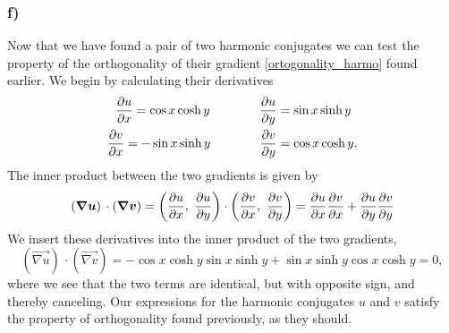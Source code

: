 \documentclass[12pt,twoside]{article}
\begin{document}
\subsubsection*{f)}
Now that we have found a pair of two harmonic conjugates we can test the property of the orthogonality of their gradient \eqref{ortogonality_harmo} found earlier. We begin by calculating their derivatives
\begin{align}
  \begin{split}
  \pdv{u}{x} = \cos{x}\cosh{y}\qquad \qquad\pdv{u}{y} &= \sin{x}\sinh{y} \\
  \pdv{v}{x} = -\sin{x}\sinh{y}\qquad \qquad\pdv{v}{y} &= \cos{x}\cosh{y}. \label{derivatives_2}
\end{split}
\end{align}
The inner product between the two gradients is given by
\begin{equation}
  \left( {\boldsymbol{{ \nabla u}}} \right) \,\cdot   \left( {\boldsymbol{{ \nabla v}}} \right) = \left( \pdv{u}{x}, \,\, \pdv{u}{y} \right)\cdot \left( \pdv{v}{x}, \,\, \pdv{v}{y} \right) = \pdv{u}{x}\pdv{v}{x} + \pdv{u}{y}\pdv{v}{y}
\end{equation}
We insert these derivatives into the inner product of the two gradients,
\begin{equation}
  \left( \vec{ \nabla u} \right) \,\cdot   \left( \vec{ \nabla v} \right) = -\cos{x}\cosh{y}\sin{x}\sinh{y} + \sin{x}\sinh{y}\cos{x}\cosh{y} = 0,
\end{equation}
where we see that the two terms are identical, but with opposite sign, and thereby canceling. Our expressions for the harmonic conjugates $u$ and $v$ satisfy the property of orthogonality found previously, as they should.
\end{document}
